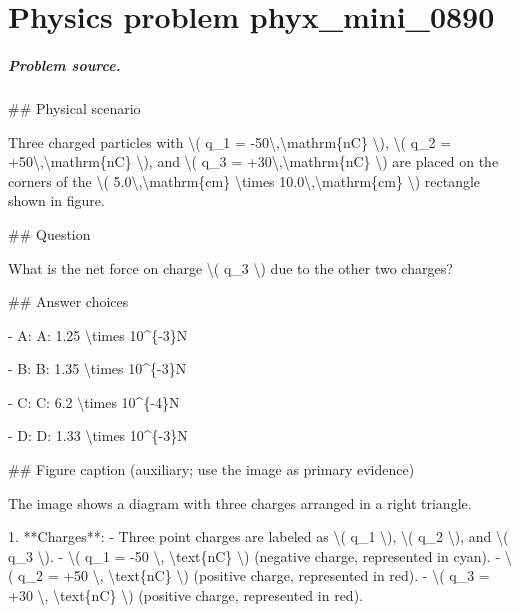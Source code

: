 
\chapter{Physics problem phyx\_mini\_0890}
\label{ch:PhyXMiniProblems_problem_phyx_mini_0890}

\paragraph{Problem source.}
\#\# Physical scenario

Three charged particles with \textbackslash{}( q\_1 = -50\textbackslash{},\textbackslash{}mathrm\{nC\} \textbackslash{}), \textbackslash{}( q\_2 = +50\textbackslash{},\textbackslash{}mathrm\{nC\} \textbackslash{}), and \textbackslash{}( q\_3 = +30\textbackslash{},\textbackslash{}mathrm\{nC\} \textbackslash{}) are placed on the corners of the \textbackslash{}( 5.0\textbackslash{},\textbackslash{}mathrm\{cm\} \textbackslash{}times 10.0\textbackslash{},\textbackslash{}mathrm\{cm\} \textbackslash{}) rectangle shown in figure.

\#\# Question

What is the net force on charge \textbackslash{}( q\_3 \textbackslash{}) due to the other two charges?

\#\# Answer choices

- A: A: 1.25 \textbackslash{}times 10\textasciicircum{}\{-3\}N

- B: B: 1.35 \textbackslash{}times 10\textasciicircum{}\{-3\}N

- C: C: 6.2 \textbackslash{}times 10\textasciicircum{}\{-4\}N

- D: D: 1.33 \textbackslash{}times 10\textasciicircum{}\{-3\}N

\#\# Figure caption (auxiliary; use the image as primary evidence)

The image shows a diagram with three charges arranged in a right triangle. 

1. **Charges**:
   - Three point charges are labeled as \textbackslash{}( q\_1 \textbackslash{}), \textbackslash{}( q\_2 \textbackslash{}), and \textbackslash{}( q\_3 \textbackslash{}).
   - \textbackslash{}( q\_1 = -50 \textbackslash{}, \textbackslash{}text\{nC\} \textbackslash{}) (negative charge, represented in cyan).
   - \textbackslash{}( q\_2 = +50 \textbackslash{}, \textbackslash{}text\{nC\} \textbackslash{}) (positive charge, represented in red).
   - \textbackslash{}( q\_3 = +30 \textbackslash{}, \textbackslash{}text\{nC\} \textbackslash{}) (positive charge, represented in red).

